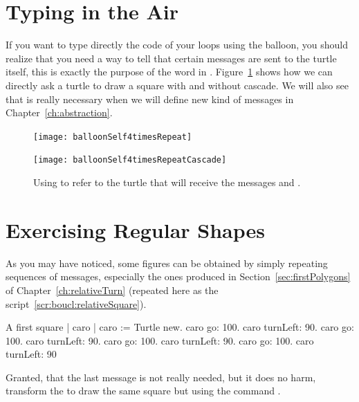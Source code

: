 \section{Typing in the Air}
If you want to type directly the code of your loops using the balloon, you should realize that you need a way to tell that certain messages are sent to the turtle itself, this is exactly the purpose of the word  in \sq. 
Figure~\ref{fig:fourtimesRepeat} shows how we can directly ask a turtle to draw a square with and without cascade. We will also see that  is really necessary when we will define new kind of messages in Chapter~\ref{ch:abstraction}.

\begin{figure}[!h]\centerline{\texttt{[image: balloonSelf4timesRepeat]}}\centerline{\texttt{[image: balloonSelf4timesRepeatCascade]}}
\caption{Using  to refer to the turtle that will receive the messages  and . \label{fig:fourtimesRepeat}}\end{figure}



\section{Exercising Regular Shapes}
As you may have noticed, some figures can be obtained by simply
repeating sequences of messages, especially the ones produced in
Section~\ref{sec:firstPolygons} of Chapter~\ref{ch:relativeTurn} (repeated here as the script~\ref{scr:boucl:relativeSquare}). 


\begin{scriptwithtitle}{A first square} \label{scr:boucl:relativeSquare}
| caro |
caro := Turtle new.
caro go: 100.
caro turnLeft: 90.
caro go: 100.
caro turnLeft: 90.
caro go: 100.
caro turnLeft: 90.
caro go: 100.
caro turnLeft: 90
\end{scriptwithtitle}


\begin{exonofig}\label{exo:squareRepeat}
Granted, that the last \turnLeft message is not really needed, but it
does no harm, transform the  to
draw the same square but using the command \timesRepeat.
\end{exonofig}


